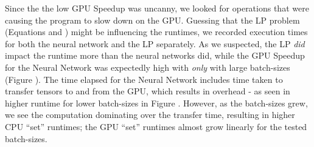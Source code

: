 \documentclass[12pt]{article}
\begin{document}
    Since the the low GPU Speedup was uncanny, we looked for operations that were causing the program to slow down on the GPU. Guessing that the LP problem (Equations  and ) might be influencing the runtimes, we recorded execution times for both the neural network and the LP separately. As we suspected, the LP \textit{did} impact the runtime more than the neural networks did, while the GPU Speedup for the Neural Network was expectedly high with \textit{only} with large batch-sizes (Figure ). The time elapsed for the Neural Network includes time taken to transfer tensors to and from the GPU, which results in overhead - as seen in higher runtime for lower batch-sizes in Figure . However, as the batch-sizes grew, we see the computation dominating over the transfer time, resulting in higher CPU ``set'' runtimes; the GPU ``set'' runtimes almost grow linearly for the tested batch-sizes.
\end{document}
